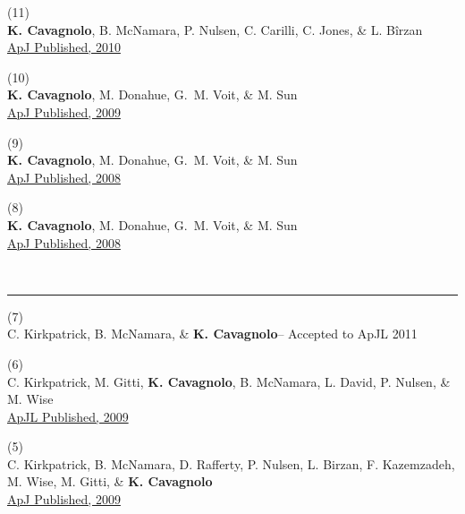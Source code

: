 \documentclass[12pt]{cv}
\begin{document}
(11) {}\\
{\bf K. Cavagnolo}, B. McNamara, P. Nulsen, C. Carilli, C. Jones, \& L. B\^irzan\\ 
\href{http://adsabs.harvard.edu/abs/2010ApJ...720.1066C}{ApJ Published, 2010}

(10) {}\\
{\bf K. Cavagnolo}, M. Donahue, G.~M. Voit, \& M. Sun\\ 
\href{http://adsabs.harvard.edu/abs/2009ApJS..182...12C}{ApJ Published, 2009}

(9) {}\\
{\bf K. Cavagnolo}, M. Donahue, G.~M. Voit, \& M. Sun\\ 
\href{http://adsabs.harvard.edu/abs/2008ApJ...683L.107C}{ApJ Published, 2008}

(8) {}\\
{\bf K. Cavagnolo}, M. Donahue, G.~M. Voit, \& M. Sun\\
\href{http://adsabs.harvard.edu/abs/2008ApJ...682..821C}{ApJ Published, 2008}

{\large{}}\vspace{-0.3cm}\\
\rule{\linewidth}{0.5pt}
(7) {}\\
C. Kirkpatrick, B. McNamara, \& {\bf K. Cavagnolo}--
Accepted to ApJL 2011

(6) {}\\
C. Kirkpatrick, M. Gitti, {\bf K. Cavagnolo}, B. McNamara, L. David, P. Nulsen, \& M. Wise\\
\href{http://adsabs.harvard.edu/abs/2009arXiv0909.2252K}{ApJL Published, 2009}

(5) {}\\
C. Kirkpatrick, B. McNamara, D. Rafferty, P. Nulsen, L. Birzan, F. Kazemzadeh, M. Wise, M. Gitti, \& {\bf K. Cavagnolo}\\
\href{http://adsabs.harvard.edu/abs/2009ApJ...697..867K}{ApJ Published, 2009}
\end{document}
